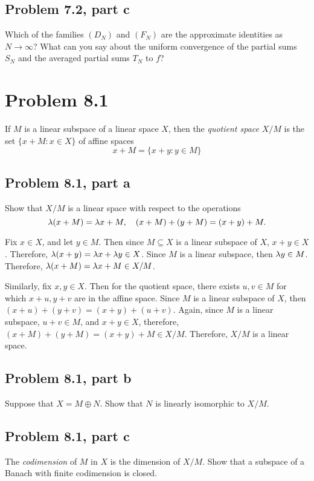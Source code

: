 \newpage
\subsection{Problem 7.2, part c}
Which of the families $(D_N)$ and $(F_N)$ are the approximate identities as $N\rightarrow \infty$? What can you say about the uniform convergence of the partial sums $S_N$ and the averaged partial sums $T_N$ to $f$?


\newpage
\section{Problem 8.1}
If $M$ is a linear subspace of a linear space $X$, then the \textit{quotient space} $X/M$ is the set $\{ x + M : x \in X\}$ of affine spaces
\[x + M = \{x + y : y \in M\}\]

\subsection{Problem 8.1, part a}
Show that $X/M$ is a linear space with respect to the operations 
\[\mathrm{\lambda}(x + M) = \mathrm{\lambda} x + M, \quad (x + M) + (y + M) = (x + y) + M.\]
\partbreak
\begin{solution}

    Fix $x \in X$, and let $y \in M$. Then since $M \subseteq X$ is a linear subspace of $X$, $x + y \in X$. Therefore, $\mathrm{\lambda}(x + y) = \mathrm{\lambda} x + \mathrm{\lambda} y \in X$. Since $M$ is a linear subspace, then $\mathrm{\lambda} y \in M$. Therefore, $\mathrm{\lambda}(x + M) = \mathrm{\lambda} x + M \in X/M$. \par
    
    \jump
    Similarly, fix $x , y \in X$. Then for the quotient space, there exists $u, v \in M$ for which $x+u, y+v$ are in the affine space. Since $M$ is a linear subspace of $X$, then $(x + u) + (y + v) = (x + y) + (u + v)$. Again, since $M$ is a linear subspace, $u + v \in M$, and $x + y \in X$, therefore, $(x + M) + (y + M) = (x + y) + M \in X/M$. Therefore, $X/M$ is a linear space.   
\end{solution}
\newpage
\subsection{Problem 8.1, part b}
Suppose that $X = M \oplus N$. Show that $N$ is linearly isomorphic to $X/M$. 

\newpage
\subsection{Problem 8.1, part c}
The \textit{codimension} of $M$ in $X$ is the dimension of $X/M$. Show that a subspace of a Banach with finite codimension is closed. 

